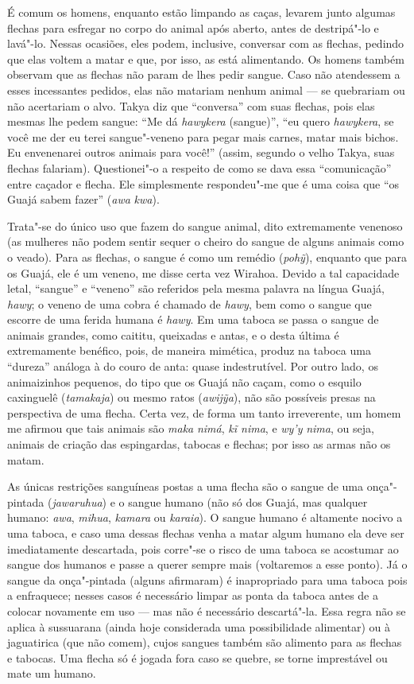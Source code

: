 É comum os homens, enquanto estão limpando as caças, levarem junto
algumas flechas para esfregar no corpo do animal após aberto, antes de
destripá"-lo e lavá"-lo. Nessas ocasiões, eles podem, inclusive, conversar
com as flechas, pedindo que elas voltem a matar e que, por isso, as está
alimentando. Os homens também observam que as flechas não param de lhes
pedir sangue. Caso não atendessem a esses incessantes pedidos, elas não
matariam nenhum animal --- se quebrariam ou não acertariam o alvo. Takya
diz que ``conversa'' com suas flechas, pois elas mesmas lhe pedem sangue:
``Me dá \emph{hawykera} (sangue)'', ``eu quero \emph{hawykera}, se você me
der eu terei sangue"-veneno para pegar mais carnes, matar mais bichos. Eu
envenenarei outros animais para você!'' (assim, segundo o velho Takya,
suas flechas falariam). Questionei"-o a respeito de como se dava essa
``comunicação'' entre caçador e flecha. Ele simplesmente respondeu"-me que
é uma coisa que ``os Guajá sabem fazer'' (\emph{awa} \emph{kwa}).

Trata"-se do único uso que fazem do sangue animal, dito extremamente
venenoso (as mulheres não podem sentir sequer o cheiro do sangue de
alguns animais como o veado). Para as flechas, o sangue é como um
remédio (\emph{pohỹ}), enquanto que para os Guajá, ele é um veneno, me
disse certa vez Wirahoa. Devido a tal capacidade letal, ``sangue'' e
``veneno'' são referidos pela mesma palavra na língua Guajá, \emph{hawy};
o veneno de uma cobra é chamado de \emph{hawy}, bem como o sangue que
escorre de uma ferida humana é \emph{hawy}. Em uma taboca se passa o
sangue de animais grandes, como caititu, queixadas e antas, e o desta
última é extremamente benéfico, pois, de maneira mimética, produz na
taboca uma ``dureza'' análoga à do couro de anta: quase indestrutível. Por
outro lado, os animaizinhos pequenos, do tipo que os Guajá não caçam,
como o esquilo caxinguelê (\emph{tamakaja}) ou mesmo ratos
(\emph{awijỹa}), não são possíveis presas na perspectiva de uma flecha.
Certa vez, de forma um tanto irreverente, um homem me afirmou que tais
animais são \emph{maka} \emph{nimá}, \emph{kĩ nima}, e \emph{wy'y}
\emph{nima}, ou seja, animais de criação das espingardas, tabocas e
flechas; por isso as armas não os matam.

As únicas restrições sanguíneas postas a uma flecha são o sangue de uma
onça"-pintada (\emph{jawaruhua}) e o sangue humano (não só dos Guajá, mas
qualquer humano: \emph{awa}, \emph{mihua}, \emph{kamara} ou
\emph{karaia}). O sangue humano é altamente nocivo a uma taboca, e caso
uma dessas flechas venha a matar algum humano ela deve ser imediatamente
descartada, pois corre"-se o risco de uma taboca se acostumar ao sangue
dos humanos e passe a querer sempre mais (voltaremos a esse ponto). Já o
sangue da onça"-pintada (alguns afirmaram) é inapropriado para uma taboca
pois a enfraquece; nesses casos é necessário limpar as ponta da taboca
antes de a colocar novamente em uso --- mas não é necessário descartá"-la.
Essa regra não se aplica à sussuarana (ainda hoje considerada uma
possibilidade alimentar) ou à jaguatirica (que não comem), cujos sangues
também são alimento para as flechas e tabocas. Uma flecha só é jogada
fora caso se quebre, se torne imprestável ou mate um humano.

